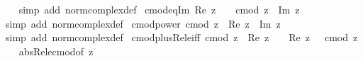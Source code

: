 \begin{isabellebody}
%
\isadelimproof
\ \ %
\endisadelimproof
%
\isatagproof
{}\isamarkupfalse%
\ {\isacharparenleft}{\kern0pt}simp\ add{\isacharcolon}{\kern0pt}\ norm{\isacharunderscore}{\kern0pt}complex{\isacharunderscore}{\kern0pt}def{\isacharparenright}{\kern0pt}%
\endisatagproof
{\isafoldproof}%
%
\isadelimproof
\isanewline
%
\endisadelimproof
\isanewline
{}\isamarkupfalse%
\ cmod{\isacharunderscore}{\kern0pt}eq{\isacharunderscore}{\kern0pt}Im{\isacharcolon}{\kern0pt}\ {\isachardoublequoteopen}Re\ z\ {\isacharequal}{\kern0pt}\ {}\ {\isasymLongrightarrow}\ cmod\ z\ {\isacharequal}{\kern0pt}\ {\isasymbar}Im\ z{\isasymbar}{\isachardoublequoteclose}\isanewline
%
\isadelimproof
\ \ %
\endisadelimproof
%
\isatagproof
{}\isamarkupfalse%
\ {\isacharparenleft}{\kern0pt}simp\ add{\isacharcolon}{\kern0pt}\ norm{\isacharunderscore}{\kern0pt}complex{\isacharunderscore}{\kern0pt}def{\isacharparenright}{\kern0pt}%
\endisatagproof
{\isafoldproof}%
%
\isadelimproof
\isanewline
%
\endisadelimproof
\isanewline
{}\isamarkupfalse%
\ cmod{\isacharunderscore}{\kern0pt}power{}{\isacharcolon}{\kern0pt}\ {\isachardoublequoteopen}{\isacharparenleft}{\kern0pt}cmod\ z{\isacharparenright}{\kern0pt}\ {\isacharequal}{\kern0pt}\ {\isacharparenleft}{\kern0pt}Re\ z{\isacharparenright}{\kern0pt}\ {\isacharplus}{\kern0pt}\ {\isacharparenleft}{\kern0pt}Im\ z{\isacharparenright}{\kern0pt}\isanewline
%
\isadelimproof
\ \ %
\endisadelimproof
%
\isatagproof
{}\isamarkupfalse%
\ {\isacharparenleft}{\kern0pt}simp\ add{\isacharcolon}{\kern0pt}\ norm{\isacharunderscore}{\kern0pt}complex{\isacharunderscore}{\kern0pt}def{\isacharparenright}{\kern0pt}%
\endisatagproof
{\isafoldproof}%
%
\isadelimproof
\isanewline
%
\endisadelimproof
\isanewline
{}\isamarkupfalse%
\ cmod{\isacharunderscore}{\kern0pt}plus{\isacharunderscore}{\kern0pt}Re{\isacharunderscore}{\kern0pt}le{\isacharunderscore}{\kern0pt}{}{\isacharunderscore}{\kern0pt}iff{\isacharcolon}{\kern0pt}\ {\isachardoublequoteopen}cmod\ z\ {\isacharplus}{\kern0pt}\ Re\ z\ {\isasymle}\ {}\ {\isasymlongleftrightarrow}\ Re\ z\ {\isacharequal}{\kern0pt}\ {\isacharminus}{\kern0pt}\ cmod\ z{\isachardoublequoteclose}\isanewline
%
\isadelimproof
\ \ %
\endisadelimproof
%
\isatagproof
{}\isamarkupfalse%
\ abs{\isacharunderscore}{\kern0pt}Re{\isacharunderscore}{\kern0pt}le{\isacharunderscore}{\kern0pt}cmod{\isacharbrackleft}{\kern0pt}of\ z{\isacharbrackright}{\kern0pt}\ \isamarkupfalse%

\end{isabellebody}
